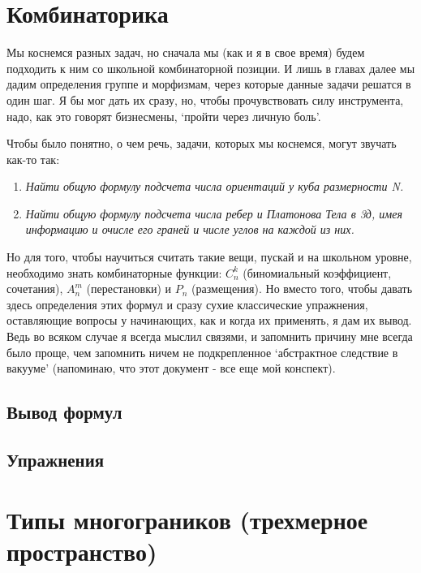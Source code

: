 \documentclass{book}
\begin{document}
\chapter{Комбинаторика}

Мы коснемся разных задач, но сначала мы (как и я в свое время) будем подходить к ним со школьной комбинаторной позиции. И лишь в главах далее мы дадим определения группе и морфизмам, через которые данные задачи решатся в один шаг. Я бы мог дать их сразу, но, чтобы прочувствовать силу инструмента, надо, как это говорят бизнесмены, `пройти через личную боль'.

Чтобы было понятно, о чем речь, задачи, которых мы коснемся, могут звучать как-то так: \\

\begin{enumerate}
\item \textit{Найти общую формулу подсчета числа ориентаций у куба размерности N.}
\item \textit{Найти общую формулу подсчета числа ребер и Платонова Тела в 3д, имея информацию и очисле его граней и числе углов на каждой из них.}
\end{enumerate}

Но для того, чтобы научиться считать такие вещи, пускай и на школьном уровне, необходимо знать комбинаторные функции: $C_n^k$ (биномиальный коэффициент, сочетания), $A_n^m$ (перестановки) и $P_n$ (размещения). Но вместо того, чтобы давать здесь определения этих формул и сразу сухие классические упражнения, оставляющие вопросы у начинающих, как и когда их применять, я дам их вывод. Ведь во всяком случае я всегда мыслил связями, и запомнить причину мне всегда было проще, чем запомнить ничем не подкрепленное `абстрактное следствие в вакууме' (напоминаю, что этот документ - все еще мой конспект).

\section{Вывод формул}

\section{Упражнения}

\chapter{Типы многограников (трехмерное пространство)}
\end{document}
